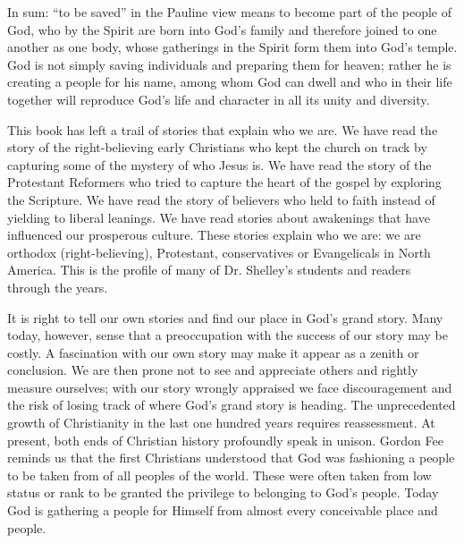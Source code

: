 

\begin{epigraphblock}
In sum: “to be saved” in the Pauline view means to become part of the people of God, who by the
Spirit are born into God’s family and therefore joined to one another as one body, whose gatherings
in the Spirit form them into God’s temple. God is not simply saving individuals and preparing them
for heaven; rather he is creating a people for his name, among whom God can dwell and who in their
life together will reproduce God’s life and character in all its unity and diversity.
\end{epigraphblock}

\noindent This book has left a trail of stories that explain who we are. We have read the story of
the right-believing early Christians who kept the church on track by capturing some of the mystery
of who Jesus is. We have read the story of the Protestant Reformers who tried to capture the heart
of the gospel by exploring the Scripture. We have read the story of believers who held to faith
instead of yielding to liberal leanings. We have read stories about awakenings that have influenced
our prosperous culture. These stories explain who we are: we are orthodox (right-believing),
Protestant, conservatives or Evangelicals in North America. This is the profile of many of Dr.
Shelley’s students and readers through the years.

It is right to tell our own stories and find our place in God’s grand story. Many today, however,
sense that a preoccupation with the success of our story may be costly. A fascination with our own
story may make it appear as a zenith or conclusion. We are then prone not to see and appreciate
others and rightly measure ourselves; with our story wrongly appraised we face discouragement and
the risk of losing track of where God’s grand story is heading. The unprecedented growth of
Christianity in the last one hundred years requires reassessment. At present, both ends of Christian
history profoundly speak in unison. Gordon Fee reminds us that the first Christians understood that
God was fashioning a people to be taken from of all peoples of the world. These were often taken
from low status or rank to be granted the privilege to belonging to God’s people. Today God is
gathering a people for Himself from almost every conceivable place and people.

